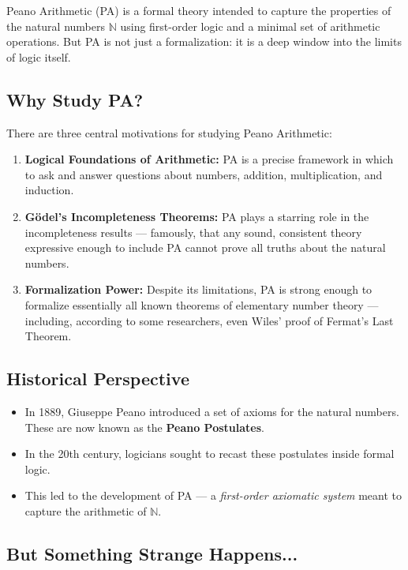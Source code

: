 \documentclass[12pt]{article}
\begin{document}
Peano Arithmetic (PA) is a formal theory intended to capture the properties of the natural numbers \(\mathbb{N}\) using first-order logic and a minimal set of arithmetic operations. But PA is not just a formalization: it is a deep window into the limits of logic itself.

\subsection{Why Study PA?}

There are three central motivations for studying Peano Arithmetic:

\begin{enumerate}[label=\textbf{M\arabic*.}]
  \item \textbf{Logical Foundations of Arithmetic:} PA is a precise framework in which to ask and answer questions about numbers, addition, multiplication, and induction.
  
  \item \textbf{Gödel's Incompleteness Theorems:} PA plays a starring role in the incompleteness results — famously, that any sound, consistent theory expressive enough to include PA cannot prove all truths about the natural numbers.
  
  \item \textbf{Formalization Power:} Despite its limitations, PA is strong enough to formalize essentially all known theorems of elementary number theory — including, according to some researchers, even Wiles’ proof of Fermat’s Last Theorem.
\end{enumerate}

\subsection{Historical Perspective}

\begin{itemize}
  \item In 1889, Giuseppe Peano introduced a set of axioms for the natural numbers. These are now known as the \textbf{Peano Postulates}.
  \item In the 20th century, logicians sought to recast these postulates inside formal logic.
  \item This led to the development of PA — a \textit{first-order axiomatic system} meant to capture the arithmetic of \(\mathbb{N}\).
\end{itemize}

\subsection{But Something Strange Happens...}
\end{document}
